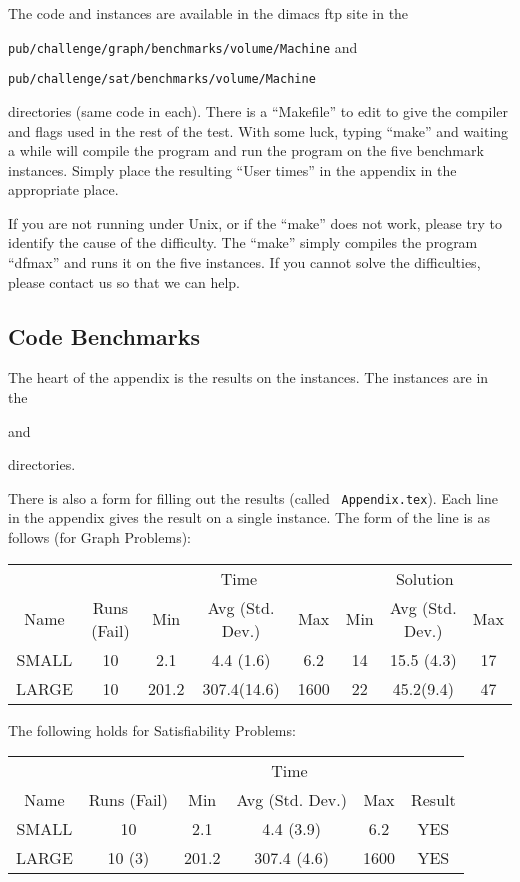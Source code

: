 The code and instances are available in the dimacs ftp site in the

{\tt pub/challenge/graph/benchmarks/volume/Machine} 
\noindent and 

{\tt pub/challenge/sat/benchmarks/volume/Machine} 

\noindent directories (same code in each).  There is a ``Makefile'' to
edit to give the compiler and flags used in the rest of the test.
With some luck, typing ``make'' and waiting a while will compile the
program and run the program on the five benchmark instances.  Simply
place the resulting ``User times'' in the appendix in the appropriate
place.

If you are not running under Unix, or if the ``make'' does not work,
please try to identify the cause of the difficulty.  The ``make''
simply compiles the program ``dfmax'' and runs it on the five
instances.  If you cannot solve the difficulties, please contact us so
that we can help.

\subsection{Code Benchmarks}

The heart of the appendix is the results on the instances.  The
instances are in the 

 and

 directories.  

There is also a form for filling out the results (called {\tt
  Appendix.tex}).  Each line in the appendix gives the result on a
single instance.  The form of the line is as follows (for Graph
Problems):

\begin{tabular}[htbp]{cc|ccc|ccc}
  &    &\multicolumn{3}{c|}{Time}&\multicolumn{3}{c}{Solution}\\
Name&Runs (Fail)&Min&Avg (Std. Dev.)&Max&Min&Avg (Std. Dev.)&Max\\\hline
SMALL&10&2.1&4.4 (1.6)&6.2&14&15.5 (4.3)&17\\
LARGE&10&201.2&307.4(14.6)&1600&22&45.2(9.4)&47\\
\end{tabular}

\medskip

The following holds for Satisfiability Problems:

\begin{tabular}[htbp]{cc|ccc|c}
  &    &\multicolumn{3}{c}{Time}&\\
Name&Runs (Fail)&Min&Avg (Std. Dev.)&Max&Result\\\hline
SMALL&10&2.1&4.4 (3.9)&6.2&YES\\
LARGE&10 (3)&201.2&307.4 (4.6)&1600&YES\\
\end{tabular}

